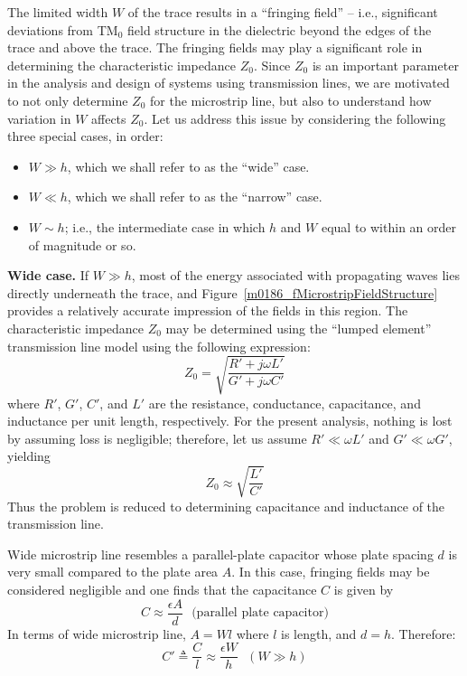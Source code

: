 The limited width $W$ of the trace results in a ``fringing field'' -- i.e., significant deviations from TM$_0$ field structure in the dielectric beyond the edges of the trace and above the trace.
The fringing fields may play a significant role in determining the characteristic impedance 
$Z_0$. 
Since $Z_0$ is an important parameter in the analysis and design of systems using transmission lines, we are motivated to not only determine $Z_0$ for the microstrip line, but also to understand how variation in $W$ affects $Z_0$.
Let us address this issue by considering the following three special cases, in order: 
\begin{itemize}
\item $W \gg h$, which we shall refer to as the ``wide'' case.
\item $W \ll h$, which we shall refer to as the ``narrow'' case.
\item $W \sim h$; i.e., the intermediate case in which $h$ and $W$ equal to within an order of magnitude or so.
\end{itemize}

{\bf Wide case.}  If $W \gg h$, most of the energy associated with propagating waves lies directly underneath the trace, and Figure~\ref{m0186_fMicrostripFieldStructure} provides a relatively accurate impression of the fields in this region.
The characteristic impedance $Z_0$ may be determined using the ``lumped element'' transmission line model 
using the following expression:
%
\begin{equation}
Z_0 = \sqrt{\frac{R'+j\omega L'}{G'+j\omega C'}}
\end{equation}
%
where $R'$, $G'$, $C'$, and $L'$ are the resistance, conductance, capacitance, and inductance per unit length, respectively.
For the present analysis, nothing is lost by assuming loss is negligible; therefore, let us assume $R' \ll \omega L'$ and $G' \ll \omega G'$, yielding
%
\begin{equation}
Z_0 \approx \sqrt{\frac{L'}{C'}}
\end{equation}
%
Thus the problem is reduced to determining capacitance and inductance of the transmission line.

Wide microstrip line resembles a parallel-plate capacitor whose plate spacing $d$ is very small compared to the plate area $A$.
In this case, fringing fields may be considered negligible and one finds that the capacitance $C$ is given by
%
\begin{equation}
C \approx \frac{\epsilon A}{d} ~~~ \mbox{(parallel plate capacitor)}
\end{equation}
%
In terms of wide microstrip line, $A=Wl$ where $l$ is length, and $d=h$.  Therefore:
%
\begin{equation}
C' \triangleq \frac{C}{l} \approx \frac{\epsilon W}{h} ~~~ (W \gg h)
\end{equation}


